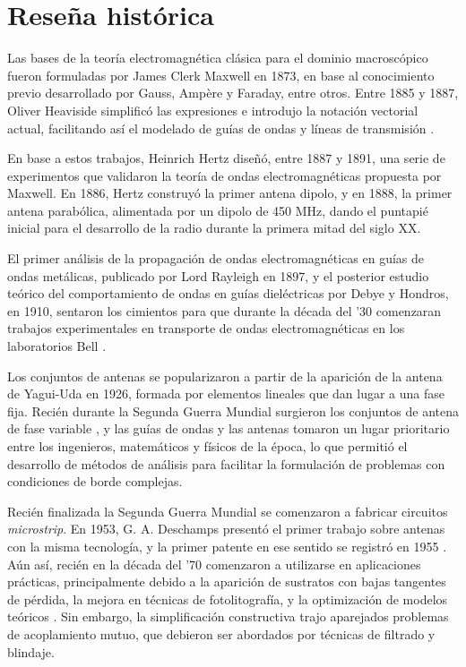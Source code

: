 

\section{Reseña histórica}
\label{sec_intro_resenia}

Las bases de la teoría electromagnética clásica para el dominio macroscópico fueron formuladas por James Clerk Maxwell en 1873, en base al conocimiento previo desarrollado por Gauss, Ampère y Faraday, entre otros. Entre 1885 y 1887, Oliver Heaviside simplificó las expresiones e introdujo la notación vectorial actual, facilitando así el modelado de guías de ondas y líneas de transmisión \cite{Pozar:MwEngineering}.

En base a estos trabajos, Heinrich Hertz diseñó, entre 1887 y 1891, una serie de experimentos que validaron la teoría de ondas electromagnéticas propuesta por Maxwell. En 1886, Hertz construyó la primer antena dipolo, y en 1888, la primer antena parabólica, alimentada por un dipolo de 450 MHz, dando el puntapié inicial para el desarrollo de la radio durante la primera mitad del siglo \textsc{XX}.

El primer análisis de la propagación de ondas electromagnéticas en guías de ondas metálicas, publicado por Lord Rayleigh en 1897, y el posterior estudio teórico del comportamiento de ondas en guías dieléctricas por Debye y Hondros, en 1910, sentaron los cimientos para que durante la década del '30 comenzaran trabajos experimentales en transporte de ondas electromagnéticas en los laboratorios Bell \cite{Collin:GuidedWaves}.

Los conjuntos de antenas se popularizaron a partir de la aparición de la antena de Yagui-Uda en 1926, formada por elementos lineales que dan lugar a una fase fija. Recién durante la Segunda Guerra Mundial surgieron los conjuntos de antena de fase variable \cite{Stutzman:AntennaTheory}, y las guías de ondas y las antenas tomaron un lugar prioritario entre los ingenieros, matemáticos y físicos de la época, lo que permitió el desarrollo de métodos de análisis para facilitar la formulación de problemas con condiciones de borde complejas.

Recién finalizada la Segunda Guerra Mundial se comenzaron a fabricar circuitos \textit{microstrip}. En 1953, G. A. Deschamps presentó el primer trabajo sobre antenas con la misma tecnología, y la primer patente en ese sentido se registró en 1955 \cite{Balanis:Handbook}. Aún así, recién en la década del '70 comenzaron a utilizarse en aplicaciones prácticas, principalmente debido a la aparición de sustratos con bajas tangentes de pérdida, la mejora en técnicas de fotolitografía, y la optimización de modelos teóricos \cite{Barthia:Handbook}. Sin embargo, la simplificación constructiva trajo aparejados problemas de acoplamiento mutuo, que debieron ser abordados por técnicas de filtrado y blindaje.

